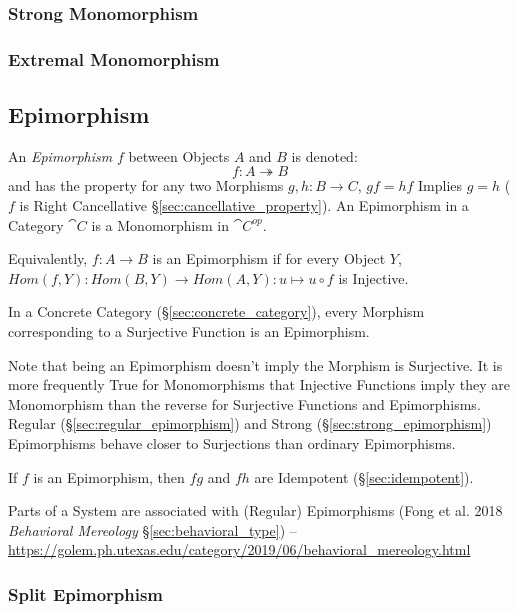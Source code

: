 \subsubsection{Strong Monomorphism}\label{sec:strong_monomorphism}

\subsubsection{Extremal Monomorphism}\label{sec:extremal_monomorphism}



\subsection{Epimorphism}\label{sec:epimorphism}

An \emph{Epimorphism} $f$ between Objects $A$ and $B$ is denoted:
\[
  f : A \twoheadrightarrow B
\]
and has the property for any two Morphisms $g, h : B \to C$, $gf = hf$ Implies
$g = h$ ($f$ is Right Cancellative \S\ref{sec:cancellative_property}). An
Epimorphism in a Category $\cat{C}$ is a Monomorphism in $\cat{C^{op}}$.

Equivalently, $f : A \to B$ is an Epimorphism if for every Object $Y$,
$Hom(f,Y) : Hom(B,Y) \to Hom(A,Y) : u \mapsto u \circ f$ is Injective.

In a Concrete Category (\S\ref{sec:concrete_category}), every Morphism
corresponding to a Surjective Function is an Epimorphism.

\fist Note that being an Epimorphism doesn't imply the Morphism is Surjective.
It is more frequently True for Monomorphisms that Injective Functions imply they
are Monomorphism than the reverse for Surjective Functions and Epimorphisms.
Regular (\S\ref{sec:regular_epimorphism}) and Strong
(\S\ref{sec:strong_epimorphism}) Epimorphisms behave closer to Surjections than
ordinary Epimorphisms.

If $f$ is an Epimorphism, then $fg$ and $fh$ are Idempotent
(\S\ref{sec:idempotent}). %

\fist Parts of a System are associated with (Regular) Epimorphisms (Fong et al.
2018 \emph{Behavioral Mereology} \S\ref{sec:behavioral_type}) --
\url{https://golem.ph.utexas.edu/category/2019/06/behavioral_mereology.html}



\subsubsection{Split Epimorphism}\label{sec:split_epimorphism}

